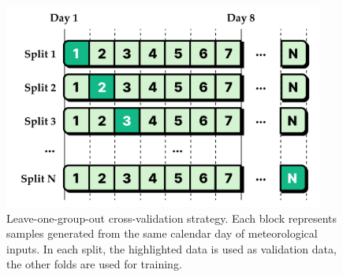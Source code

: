 \begin{figure}[ht]
	\centering
    \includegraphics[width=10.5cm]{img/cv-folds.png}
	\caption[Illustration of leave-one-group-out cross-validation strategy.]{Leave-one-group-out cross-validation strategy. Each block represents samples generated from the same calendar day of meteorological inputs. In each split, the highlighted data is used as validation data, the other folds are used for training.}
	\label{fig:methods-cv-folds}
\end{figure}